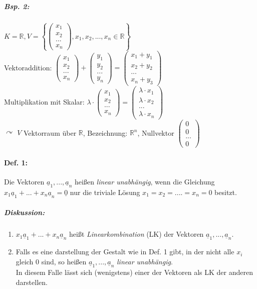 \subparagraph{Bsp. 2:} \parskp
$K = \mathbb{R}, V = \left\lbrace \begin{pmatrix}
x_1\\ x_2 \\ ... \\ x_n
\end{pmatrix}, x_1, x_2, ..., x_n \in \mathbb{R}\right\rbrace$\\
Vektoraddition: $\begin{pmatrix}
x_1\\ x_2 \\ ... \\ x_n
\end{pmatrix} + \begin{pmatrix}
y_1\\ y_2 \\ ... \\ y_n
\end{pmatrix}=\begin{pmatrix}
x_1+y_1\\ x_2+y_2 \\ ... \\ x_n+y_3
\end{pmatrix}$\\
Multiplikation mit Skalar: $\lambda \cdot \begin{pmatrix}
x_1\\ x_2 \\ ... \\ x_n
\end{pmatrix} = \begin{pmatrix}
\lambda \cdot x_1\\ \lambda \cdot x_2 \\ ... \\  \lambda \cdot x_n
\end{pmatrix}$\medskip\\
$\curvearrowright$ $V$ Vektorraum über $\mathbb{R}$, Bezeichnung: $\mathbb{R}^n$, Nullvektor $\begin{pmatrix}
0\\ 0 \\ ... \\ 0
\end{pmatrix}$
\paragraph{Def. 1:} \parskp
Die Vektoren $\underline{a}_1, ..., \underline{a}_n$ heißen \emph{linear unabhängig}, wenn die Gleichung $\boxed{x_1\underline{a}_1+...+x_n\underline{a}_n=\underline{0}}$ nur die triviale Lösung $x_1=x_2 = .... =x_n = 0$ besitzt.
\subparagraph{Diskussion:}
\begin{enumerate}
\item $x_1\underline{a}_1+...+x_n\underline{a}_n$ heißt \emph{Linearkombination} (LK) der Vektoren $\underline{a}_1, ..., \underline{a}_n$.
\item Falls es eine darstellung der Gestalt wie in Def. 1 gibt, in der nicht alle $x_i$ gleich 0 sind, so heißen $\underline{a}_1, ..., \underline{a}_n$ \emph{linear unabhängig}.\\
In diesem Falle lässt sich (wenigstens) einer der Vektoren als LK der anderen darstellen.
\end{enumerate}

